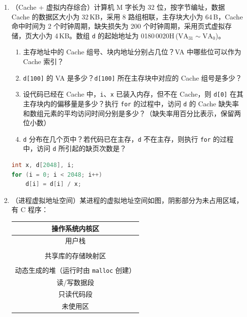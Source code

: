 \documentclass[12pt,a4paper]{ctexart}
\begin{document}
\begin{enumerate}[leftmargin=*,resume]

\item （Cache + 虚拟内存综合）计算机 M 字长为 32 位，按字节编址，数据 Cache 的数据区大小为 32\,KB，采用 8 路组相联，主存块大小为 64\,B，Cache 命中时间为 2 个时钟周期，缺失损失为 200 个时钟周期，采用页式虚拟存储，页大小为 4\,KB。数组 \texttt{d} 的起始地址为 0180\,0020H\,($\mathrm{VA}_{31}\sim\mathrm{VA}_0$)。

\begin{enumerate}[label=(\arabic*)]
\item 主存地址中的 Cache 组号、块内地址分别占几位？VA 中哪些位可以作为 Cache 索引？
\item \texttt{d[100]} 的 VA 是多少？\texttt{d[100]} 所在主存块中对应的 Cache 组号是多少？
\item 设代码已经在 Cache 中，\texttt{i}、\texttt{x} 已装入内存，但不在 Cache，则 \texttt{d[0]} 在其主存块内的偏移量是多少？执行 \texttt{for} 的过程中，访问 \texttt{d} 的 Cache 缺失率和数组元素的平均访问时间分别是多少？（缺失率用百分比表示，保留两位小数）
\item \texttt{d} 分布在几个页中？若代码已在主存，\texttt{d} 不在主存，则执行 \texttt{for} 的过程中，访问 \texttt{d} 所引起的缺页次数是？
\end{enumerate}

\begin{lstlisting}[language=C]
int x, d[2048], i;
for (i = 0; i < 2048; i++)
    d[i] = d[i] / x;
\end{lstlisting}

\item （进程虚拟地址空间）某进程的虚拟地址空间如图，阴影部分为未占用区域，有 C 程序：

\begin{center}
\begin{tabular}{|c|}
\hline
操作系统内核区 \\
\hline
用户栈 \\
\hline
\rule{0pt}{12pt} \\
\hline
共享库的存储映射区 \\
\hline
\rule{0pt}{12pt} \\
\hline
动态生成的堆（运行时由 \texttt{malloc} 创建） \\
\hline
读/写数据段 \\
\hline
只读代码段 \\
\hline
未使用区 \\
\hline
\end{tabular}
\end{center}


\end{enumerate}
\end{document}
